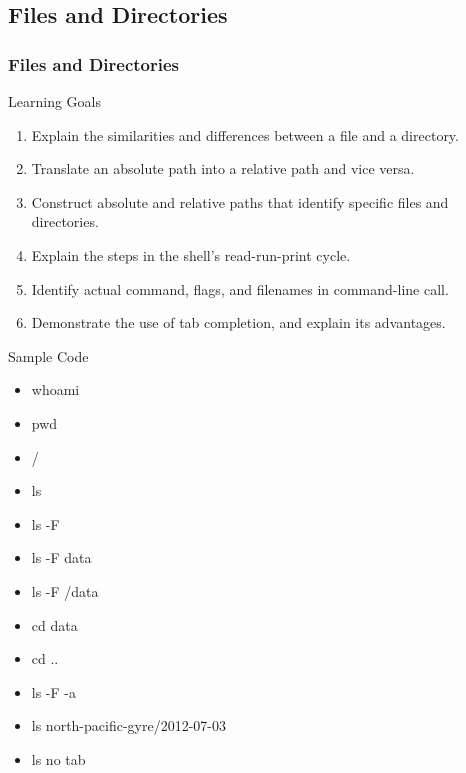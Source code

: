 \documentclass{beamer}
\begin{document}

\subsection*{Files and Directories}


\begin{frame}
\frametitle{Files and Directories}
\small{
\begin{block}{Learning Goals}
\begin{enumerate}
\item    Explain the similarities and differences between a file and a directory.
\item    Translate an absolute path into a relative path and vice versa.
\item    Construct absolute and relative paths that identify specific files and directories.
\item    Explain the steps in the shell's read-run-print cycle.
\item    Identify actual command, flags, and filenames in command-line call.
\item    Demonstrate the use of tab completion, and explain its advantages.
\end{enumerate}
\end{block}}
\begin{block}{Sample Code}
\begin{multicols}{3}
\begin{itemize}
\item whoami
\item pwd
\item /
\item ls
\item ls -F
\item ls -F data
\item ls -F /data
\item cd data
\item cd ..
\item ls -F -a
\item ls north-pacific-gyre/2012-07-03
\item ls no tab
\end{itemize}
\end{multicols}
\end{block}
\end{frame}
\end{document}

